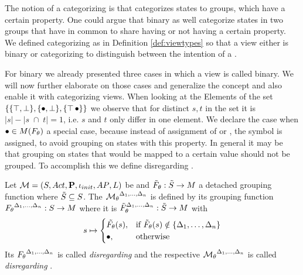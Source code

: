 \documentclass[preview]{standalone}
\begin{document}
The notion of a categorizing \viewN is that categorizes states to groups, which have a certain property. One could argue that binary \viewsN as well categorize states in two groups that have in common to share having or not having a certain property. We defined categorizing \viewsN as in Definition \ref{def:viewtypes} so that a view either is binary or categorizing to distinguish between the intention of a \viewN.

For binary \view we already presented three cases in which a view is called binary. We will now further elaborate on those cases and generalize the concept and also enable it with categorizing views. When looking at the Elements of the set $\{\{{\top}, {\bot}\}, \{{\bullet}, {\bot}\}, \{{\top}\, {\bullet}\}\}$ we observe that for distinct $s,t$ in the set it is $|s|-|s \; \cap \; t| = 1$, i.e. $s$ and $t$ only differ in one element. We declare the case when ${\bullet} \in M({F_{{\theta}}})$ a special case, because instead of assignment of \hasppty or \notppty, the symbol \remelem is assigned, to avoid grouping on states with this property. In general it may be that grouping on states that would be mapped to a certain value should not be grouped. To accomplish this we define disregarding \viewsN.

\begin{definition}
	Let ${{{\mathcal{M}}}} = {{({S}, {Act}, {\textbf{P}}, {\iota_{init}}, {AP}, {L})}}$ be \achgphN and ${\tilde{F}_{{\theta}}} : {\tilde{{S}}} \to {\ensuremath{{M}}}$ a detached grouping function where ${\tilde{{S}}} \subseteq {S}$. The \viewN ${{{{\mathcal{M}}}}_{{\theta}}}^{{{\Delta}_1, \dots, {\Delta}_n}}$ is defined by its grouping function ${F_{{\theta}}}^{{{\Delta}_1, \dots, {\Delta}_n}} : {S} \to {\ensuremath{{M}}}$ where it is ${\tilde{F}_{{\theta}}}^{{{\Delta}_1, \dots, {\Delta}_n}} : {\tilde{{S}}} \to {\ensuremath{{M}}}$ with
	\[
	\state \mapsto
	\begin{cases}
		\tilde\grpfct(\state),				& \text{if } \grpfctsub(\state) \notin \{\disregardelements\} \\ 		\remelem,          	& \text{otherwise}
	\end{cases}
	\]
	Its \grpfctN ${F_{{\theta}}}^{{{\Delta}_1, \dots, {\Delta}_n}}$ is called \grpfct \emph{disregarding} \disregardelements and the respective \viewN ${{{{\mathcal{M}}}}_{{\theta}}}^{{{\Delta}_1, \dots, {\Delta}_n}}$ is called \view \emph{disregarding} \disregardelements. 
\end{definition}
\end{document}

